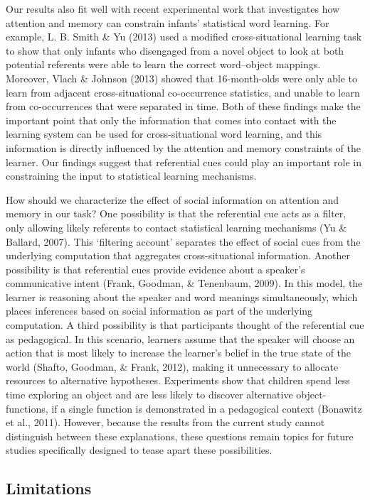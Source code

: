 \documentclass[authoryear, review]{elsarticle}
\begin{document}
Our results also fit well with recent experimental work that
investigates how attention and memory can constrain infants' statistical
word learning. For example, L. B. Smith \& Yu (2013) used a modified
cross-situational learning task to show that only infants who disengaged
from a novel object to look at both potential referents were able to
learn the correct word--object mappings. Moreover, Vlach \& Johnson
(2013) showed that 16-month-olds were only able to learn from adjacent
cross-situational co-occurrence statistics, and unable to learn from
co-occurrences that were separated in time. Both of these findings make
the important point that only the information that comes into contact
with the learning system can be used for cross-situational word
learning, and this information is directly influenced by the attention
and memory constraints of the learner. Our findings suggest that
referential cues could play an important role in constraining the input
to statistical learning mechanisms.

How should we characterize the effect of social information on attention
and memory in our task? One possibility is that the referential cue acts
as a filter, only allowing likely referents to contact statistical
learning mechanisms (Yu \& Ballard, 2007). This `filtering account'
separates the effect of social cues from the underlying computation that
aggregates cross-situational information. Another possibility is that
referential cues provide evidence about a speaker's communicative intent
(Frank, Goodman, \& Tenenbaum, 2009). In this model, the learner is
reasoning about the speaker and word meanings simultaneously, which
places inferences based on social information as part of the underlying
computation. A third possibility is that participants thought of the
referential cue as pedagogical. In this scenario, learners assume that
the speaker will choose an action that is most likely to increase the
learner's belief in the true state of the world (Shafto, Goodman, \&
Frank, 2012), making it unnecessary to allocate resources to alternative
hypotheses. Experiments show that children spend less time exploring an
object and are less likely to discover alternative object-functions, if
a single function is demonstrated in a pedagogical context (Bonawitz et
al., 2011). However, because the results from the current study cannot
distinguish between these explanations, these questions remain topics
for future studies specifically designed to tease apart these
possibilities.

\subsection{Limitations}\label{limitations}
\end{document}
